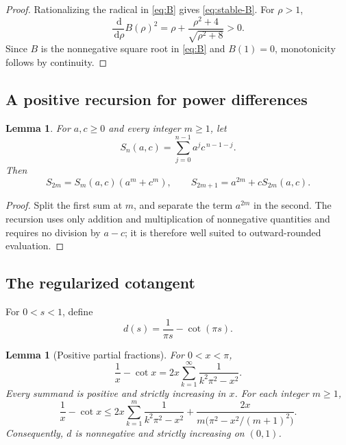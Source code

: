 \documentclass[11pt,a4paper,twoside]{article}
\newcommand{\manualtag}[1]{\tag{#1}}
\newtheorem{lemma}[theorem]{Lemma}
\theoremstyle{remark}
\newcommand{\dd}{\,\mathrm{d}}
\begin{document}
\begin{proof}
Rationalizing the radical in \eqref{eq:B} gives
\eqref{eq:stable-B}.  For \(\rho>1\),
\[
 \frac{\dd}{\dd\rho}B(\rho)^2
 =
 \rho+\frac{\rho^2+4}{\sqrt{\rho^2+8}}>0.
\]
Since \(B\) is the nonnegative square root in \eqref{eq:B} and
\(B(1)=0\), monotonicity follows by continuity.
\end{proof}

\subsection{A positive recursion for power differences}

\begin{lemma}\label{lem:positive-recursion}
For \(a,c\ge0\) and every integer \(m\ge1\), let
\[
 S_n(a,c)=\sum_{j=0}^{n-1}a^jc^{\,n-1-j}.
\]
Then
\[
 S_{2m}=S_m(a,c)(a^m+c^m),
 \qquad
 S_{2m+1}=a^{2m}+cS_{2m}(a,c).
\]
\end{lemma}

\begin{proof}
Split the first sum at \(m\), and separate the term \(a^{2m}\) in
the second.  The recursion uses only addition and multiplication of
nonnegative quantities and requires no division by \(a-c\); it is therefore
well suited to outward-rounded evaluation.
\end{proof}

\subsection{The regularized cotangent}

For \(0<s<1\), define
\begin{equation}
 d(s)=\frac1{\pi s}-\cot(\pi s).
 \manualtag{21}\label{eq:d}
\end{equation}

\begin{lemma}[Positive partial fractions]\label{lem:cotangent}
For \(0<x<\pi\),
\begin{equation}
 \frac1x-\cot x
 =
 2x\sum_{k=1}^{\infty}
 \frac1{k^2\pi^2-x^2}.
 \manualtag{22}\label{eq:cot-series}
\end{equation}
Every summand is positive and strictly increasing in \(x\).  For each
integer \(m\ge1\),
\begin{equation}
 \frac1x-\cot x
 \le
 2x\sum_{k=1}^{m}
 \frac1{k^2\pi^2-x^2}
 +
 \frac{2x}{
   m\bigl(\pi^2-x^2/(m+1)^2\bigr)}.
 \manualtag{23}\label{eq:cot-tail}
\end{equation}
Consequently, \(d\) is nonnegative and strictly increasing on \((0,1)\).
\end{lemma}
\end{document}
